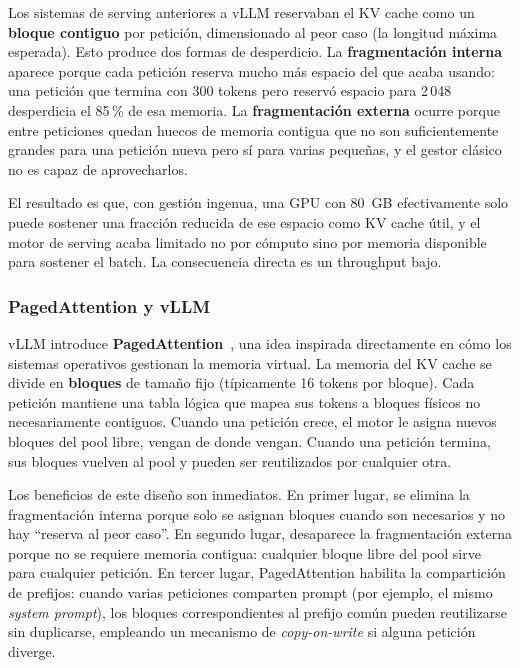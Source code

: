\documentclass[11pt,a4paper]{article}
\begin{document}
Los sistemas de serving anteriores a vLLM reservaban el KV cache como un \textbf{bloque contiguo} por petición, dimensionado al peor caso (la longitud máxima esperada). Esto produce dos formas de desperdicio. La \textbf{fragmentación interna} aparece porque cada petición reserva mucho más espacio del que acaba usando: una petición que termina con 300 tokens pero reservó espacio para 2\,048 desperdicia el 85\,\% de esa memoria. La \textbf{fragmentación externa} ocurre porque entre peticiones quedan huecos de memoria contigua que no son suficientemente grandes para una petición nueva pero sí para varias pequeñas, y el gestor clásico no es capaz de aprovecharlos.

El resultado es que, con gestión ingenua, una GPU con 80~GB efectivamente solo puede sostener una fracción reducida de ese espacio como KV cache útil, y el motor de serving acaba limitado no por cómputo sino por memoria disponible para sostener el batch. La consecuencia directa es un throughput bajo.

\subsubsection{PagedAttention y vLLM}

vLLM introduce \textbf{PagedAttention}~\cite{vllm2023}, una idea inspirada directamente en cómo los sistemas operativos gestionan la memoria virtual. La memoria del KV cache se divide en \textbf{bloques} de tamaño fijo (típicamente 16 tokens por bloque). Cada petición mantiene una tabla lógica que mapea sus tokens a bloques físicos no necesariamente contiguos. Cuando una petición crece, el motor le asigna nuevos bloques del pool libre, vengan de donde vengan. Cuando una petición termina, sus bloques vuelven al pool y pueden ser reutilizados por cualquier otra.

Los beneficios de este diseño son inmediatos. En primer lugar, se elimina la fragmentación interna porque solo se asignan bloques cuando son necesarios y no hay ``reserva al peor caso''. En segundo lugar, desaparece la fragmentación externa porque no se requiere memoria contigua: cualquier bloque libre del pool sirve para cualquier petición. En tercer lugar, PagedAttention habilita la compartición de prefijos: cuando varias peticiones comparten prompt (por ejemplo, el mismo \textit{system prompt}), los bloques correspondientes al prefijo común pueden reutilizarse sin duplicarse, empleando un mecanismo de \textit{copy-on-write} si alguna petición diverge.
\end{document}
